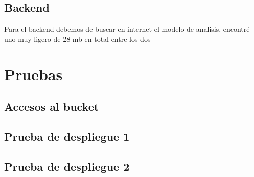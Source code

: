 \documentclass{article}
\begin{document}
	\subsection{Backend}

	Para el backend debemos de buscar en internet el modelo de analisis, encontré uno muy ligero de 28 mb en total entre los dos 


	\section{Pruebas}

	\subsection{Accesos al bucket}

	\subsection{Prueba de despliegue 1}


	\subsection{Prueba de despliegue 2}
\end{document}
